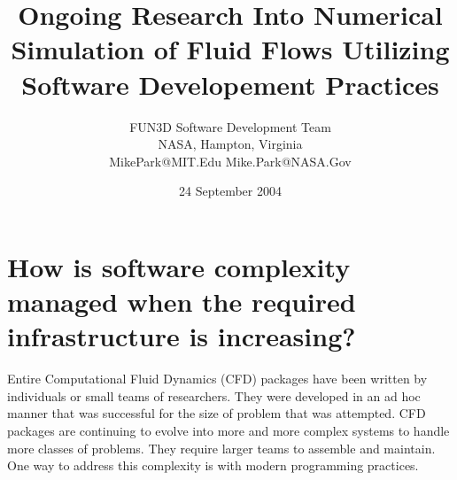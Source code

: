 \documentclass[twocolumn]{article}
\title{Ongoing Research Into Numerical Simulation 
       of Fluid Flows Utilizing Software Developement Practices}
\author{
FUN3D Software Development Team\\
NASA, Hampton, Virginia\\
MikePark@MIT.Edu Mike.Park@NASA.Gov \\
}
\date{24 September 2004}
\begin{document}
  
  \maketitle

  \section{How is software complexity managed when the required 
    infrastructure is increasing?}  Entire Computational Fluid
  Dynamics (CFD) packages have been written by individuals or small
  teams of researchers. They were developed in an ad hoc manner that
  was successful for the size of problem that was attempted. CFD
  packages are continuing to evolve into more and more complex systems
  to handle more classes of problems. They require larger teams to
  assemble and maintain. One way to address this complexity is with
  modern programming practices.
\end{document}
